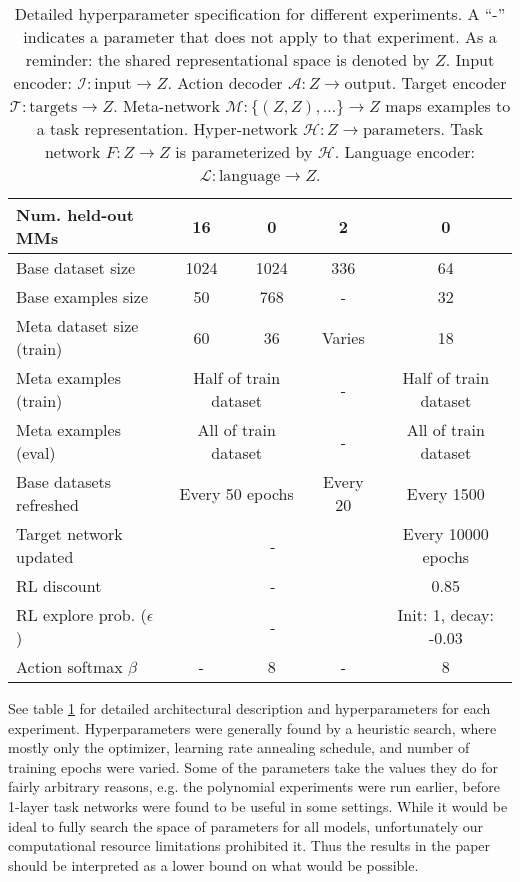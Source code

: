 \begin{table}
\begin{tabular}{|p{3cm}||c|c|c|c|}
Num. held-out MMs & 16 & 0 & 2 & 0  \\\hline
Base dataset size & 1024 & 1024 & 336 & 64 \\\hline
Base examples size & 50 & 768 & - & 32 \\\hline
Meta dataset size (train) & 60 & 36 & Varies & 18 \\\hline
Meta examples (train) & \multicolumn{2}{c|}{Half of train dataset} & - & Half of train dataset \\\hline
Meta examples (eval) & \multicolumn{2}{c|}{All of train dataset} & - & All of train dataset \\\hline
Base datasets refreshed & \multicolumn{2}{c|}{Every 50 epochs} & Every 20 & Every 1500  \\\hline
Target network updated & \multicolumn{3}{c|}{-} & Every 10000 epochs  \\\hline
RL discount & \multicolumn{3}{c|}{-} & 0.85 \\\hline
RL explore prob. (\(\epsilon\)) & \multicolumn{3}{c|}{-} & \multicolumn{1}{p{2.5cm}|}{Init: 1, decay: -0.03}\\\hline
Action softmax \(\beta\) & - & 8 & - & 8\\\hline
\end{tabular}
\caption[Detailed hyperparameter specification.]{Detailed hyperparameter specification for different experiments. A ``-'' indicates a parameter that does not apply to that experiment. As a reminder: the shared representational space is denoted by $Z$. Input encoder: $\mathcal{I}: \text{input} \rightarrow Z$. Action decoder $\mathcal{A}: Z \rightarrow \text{output}$. Target encoder $\mathcal{T}: \text{targets} \rightarrow Z$. Meta-network $\mathcal{M}: \{(Z, Z), ...\} \rightarrow Z $ maps examples to a task representation. Hyper-network $\mathcal{H}: Z \rightarrow \text{parameters}$. Task network $F: Z \rightarrow Z$ is parameterized by $\mathcal{H}$. Language encoder: $\mathcal{L}: \text{language} \rightarrow Z$. } \label{supp_hyperparameter_table}
\end{table}
See table \ref{supp_hyperparameter_table} for detailed architectural description and hyperparameters for each experiment. Hyperparameters were generally found by a heuristic search, where mostly only the optimizer, learning rate annealing schedule, and number of training epochs were varied. Some of the parameters take the values they do for fairly arbitrary reasons, e.g. the polynomial experiments were run earlier, before 1-layer task networks were found to be useful in some settings. While it would be ideal to fully search the space of parameters for all models, unfortunately our computational resource limitations prohibited it. Thus the results in the paper should be interpreted as a lower bound on what would be possible. \par
